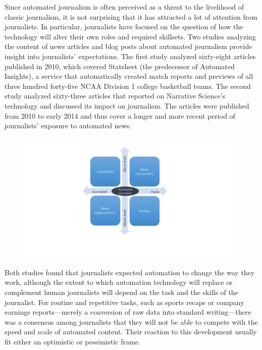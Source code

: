 \documentclass[notoc, symmetric, nobib, nols]{towcenter-guideto-book}
\begin{document}
Since automated journalism is often perceived as a threat to the livelihood of classic journalism, it is not surprising that it has attracted a lot of attention from journalists. In particular, journalists have focused on the question of how the technology will alter their own roles and required skillsets. Two studies analyzing the content of news articles and blog posts about automated journalism provide insight into journalists' expectations. The first study analyzed sixty-eight articles published in 2010, which covered Statsheet (the predecessor of Automated Insights), a service that automatically created match reports and previews of all three hundred forty-five NCAA Division 1 college basketball teams.\autocite{dalen12} The second study analyzed sixty-three articles that reported on Narrative Science's technology and discussed its impact on journalism.\autocite{carlson15} The articles were published from 2010 to early 2014 and thus cover a longer and more recent period of journalists' exposure to automated news.\\
\begin{figure}
\begin{centering}
\includegraphics[width=\textwidth]{graphics/aj_image2.jpg}
\caption{}
\end{centering}
\end{figure}

Both studies found that journalists expected automation to change the way they work, although the extent to which automation technology will replace or complement human journalists will depend on the task and the skills of the journalist. For routine and repetitive tasks, such as sports recaps or company earnings reports---merely a conversion of raw data into standard writing---there was a consensus among journalists that they will not be able to compete with the speed and scale of automated content. Their reaction to this development usually fit either an optimistic or pessimistic frame. 
\end{document}
